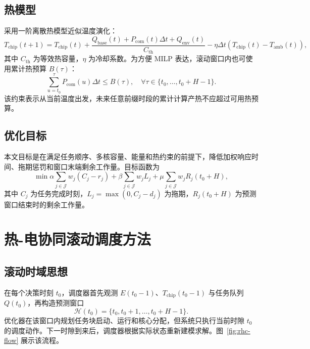 \documentclass[conference]{IEEEtran}
\begin{document}
\subsection{热模型}

采用一阶离散热模型近似温度演化：
\begin{equation}
  T_{\mathrm{chip}}(t+1)=T_{\mathrm{chip}}(t)
  +\frac{Q_{\mathrm{base}}(t)+P_{\mathrm{com}}(t)\Delta t+Q_{\mathrm{env}}(t)}{C_{\mathrm{th}}}
  -\eta\Delta t\left(T_{\mathrm{chip}}(t)-T_{\mathrm{amb}}(t)\right),
\end{equation}
其中 $C_{\mathrm{th}}$ 为等效热容量，$\eta$ 为冷却系数。为方便 MILP 表达，滚动窗口内也可使用累计热预算 $B(\tau)$：
\begin{equation}
  \sum_{u=t_0}^{\tau}P_{\mathrm{com}}(u)\Delta t \le B(\tau),\quad
  \forall \tau\in\{t_0,\dots,t_0+H-1\}.
\end{equation}
该约束表示从当前温度出发，未来任意前缀时段的累计计算产热不应超过可用热预算。

\subsection{优化目标}

本文目标是在满足任务顺序、多核容量、能量和热约束的前提下，降低加权响应时间、拖期惩罚和窗口末端剩余工作量。目标函数为
\begin{equation}
\min
\alpha\sum_{j\in\mathcal{J}}w_j(C_j-r_j)
+\beta\sum_{j\in\mathcal{J}}w_jL_j
+\mu\sum_{j\in\mathcal{J}}w_jR_j(t_0+H),
\label{eq:objective}
\end{equation}
其中 $C_j$ 为任务完成时刻，$L_j=\max(0,C_j-d_j)$ 为拖期，$R_j(t_0+H)$ 为预测窗口结束时的剩余工作量。

\section{热-电协同滚动调度方法}

\subsection{滚动时域思想}

在每个决策时刻 $t_0$，调度器首先观测 $E(t_0-1)$、$T_{\mathrm{chip}}(t_0-1)$ 与任务队列 $Q(t_0)$，再构造预测窗口
\begin{equation}
  \mathcal{H}(t_0)=\{t_0,t_0+1,\dots,t_0+H-1\}.
\end{equation}
优化器在该窗口内规划任务块启动、运行和核心分配，但系统只执行当前时隙 $t_0$ 的调度动作。下一时隙到来后，调度器根据实际状态重新建模求解。图~\ref{fig:rhc-flow} 展示该流程。
\end{document}
